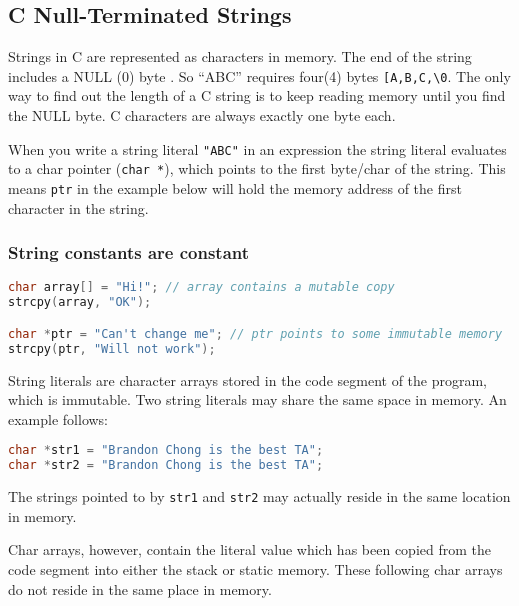 \subsection{C Null-Terminated Strings}

Strings in C are represented as characters in memory. The end of the string includes a NULL (0) byte \cite{CITATION_NEEDED}. So ``ABC'' requires four(4) bytes \texttt{{[}\textquotesingle{}A\textquotesingle{},\textquotesingle{}B\textquotesingle{},\textquotesingle{}C\textquotesingle{},\textquotesingle{}\textbackslash{}0\textquotesingle{}{]}}.
The only way to find out the length of a C string is to keep reading memory until you find the NULL byte. C characters are always exactly one byte each.

When you write a string literal \texttt{"ABC"} in an expression the string literal evaluates to a char pointer (\texttt{char\ *}), which points to the first byte/char of the string. This means \texttt{ptr} in the example below will hold the memory address of the first character in the string.

\subsubsection{String constants are constant}

\begin{lstlisting}[language=C]
char array[] = "Hi!"; // array contains a mutable copy 
strcpy(array, "OK");

char *ptr = "Can't change me"; // ptr points to some immutable memory
strcpy(ptr, "Will not work");
\end{lstlisting}

String literals are character arrays stored in the code segment of the
program, which is immutable. Two string literals may share the same
space in memory. An example follows:

\begin{lstlisting}[language=C]
char *str1 = "Brandon Chong is the best TA";
char *str2 = "Brandon Chong is the best TA";
\end{lstlisting}

The strings pointed to by \texttt{str1} and \texttt{str2} may actually
reside in the same location in memory.

Char arrays, however, contain the literal value which has been copied
from the code segment into either the stack or static memory. These
following char arrays do not reside in the same place in memory.

